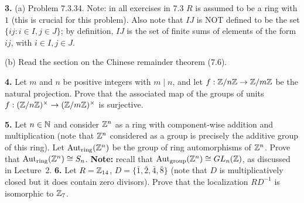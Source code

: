 \documentclass[12pt]{amsart}
\begin{document}
{\bf 3.} (a) Problem 7.3.34. Note: in all exercises in 7.3 $R$ is assumed to be a ring  
with $1$ (this is crucial for this problem). Also note that $IJ$ is NOT defined to be the set 
$\{ij: i\in I, j\in J\}$;  by definition, $IJ$ is the set of finite sums of elements of the form 
$ij$, with $i\in I, j\in J$.  

(b) Read the section on the Chinese remainder theorem (7.6).

\skv
{\bf 4.} Let $m$ and $n$ be positive integers with $m\mid n$, and let $f:{\mathbb Z}/n{\mathbb Z}\to {\mathbb Z}/m{\mathbb Z}$ be the natural projection. Prove that the associated map of the groups of units $f:({\mathbb Z}/n{\mathbb Z})^{\times}\to ({\mathbb Z}/m{\mathbb Z})^{\times}$ is surjective.

\newpage
{\bf 5.} Let $n\in{\mathbb N}$ and consider ${\mathbb Z}^n$ as a ring with component-wise addition and multiplication (note that ${\mathbb Z}^n$ considered as a group is precisely the additive group of this ring). Let ${\rm Aut}_{\rm ring}({\mathbb Z}^n)$ be the group of ring automorphisms of ${\mathbb Z}^n$. Prove that ${\rm Aut}_{\rm ring}({\mathbb Z}^n)\cong S_n$. {\bf Note:} recall that ${\rm Aut}_{\rm group}({\mathbb Z}^n)\cong GL_n({\mathbb Z})$, as discussed in Lecture~2.
\skv
{\bf 6.} Let $R={\mathbb Z}_{14}$, $D=\{\bar 1,\bar 2,\bar 4,\bar 8\}$ (note that $D$ is multiplicatively closed
but it does contain zero divisors). Prove that the localization $RD^{-1}$ is isomorphic to ${\mathbb Z}_{7}$.
\end{document}
